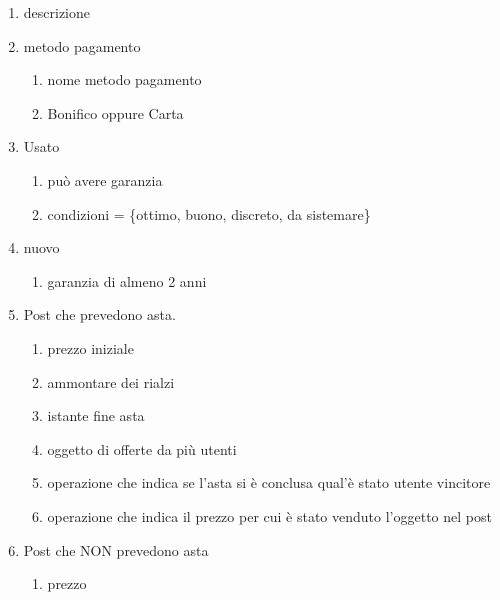 \documentclass{article}
\begin{document}
\begin{enumerate}[label=\arabic*.]
\begin{enumerate}[label=\arabic{enumi}.\arabic*.]
                    \item descrizione
                    \item metodo pagamento
                    \begin{enumerate}[label=\arabic{enumi}.\arabic{enumii}.\arabic*.]
                        \item nome metodo pagamento
                        \item Bonifico oppure Carta
                    \end{enumerate}
                    \item Usato
                    \begin{enumerate}[label=\arabic{enumi}.\arabic{enumii}.\arabic*.]
                        \item può avere garanzia
                        \item condizioni = \{ottimo, buono, discreto, da sistemare\}
                    \end{enumerate}
                    \item nuovo
                    \begin{enumerate}[label=\arabic{enumi}.\arabic{enumii}.\arabic*.]
                        \item garanzia di almeno 2 anni
                    \end{enumerate}
                    \item Post che prevedono asta.
                    \begin{enumerate}[label=\arabic{enumi}.\arabic{enumii}.\arabic*.]
                        \item prezzo iniziale
                        \item ammontare dei rialzi
                        \item istante fine asta
                        \item oggetto di offerte da più utenti
                        \item operazione che indica se l'asta si è conclusa qual'è stato utente vincitore
                        \item operazione che indica il prezzo per cui è stato venduto l'oggetto nel post
                    \end{enumerate}
                    \item Post che NON prevedono asta
                    \begin{enumerate}[label=\arabic{enumi}.\arabic{enumii}.\arabic*.]
                        \item prezzo

\end{enumerate}
\end{enumerate}
\end{enumerate}
\end{document}
